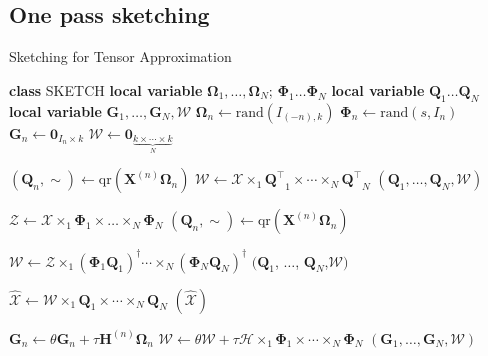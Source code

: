 \subsection{One pass sketching}


\begin{algorithm}[ht]
\caption{Sketching for Tensor Approximation}\label{alg:tensor_approx}
  \begin{algorithmic}[1]
  \State \textbf{class} SKETCH 
  \State \textbf{local variable} $\mathbf{\Omega}_1, \dots, \mathbf{\Omega}_N$;  $\mathbf{\Phi}_1 \dots \mathbf{\Phi}_N$  
  \State \textbf{local variable} $\mathbf{Q}_1 \dots \mathbf{Q}_N$ 
  \State \textbf{local variable} $\mathbf{G}_1, \dots, \mathbf{G}_N, \mathscr{W} $
  \Require
  \Statex 
  \Ensure
  \Statex 
    \State $\mathbf{\Omega}_n \leftarrow  \text{rand}(I_{(-n), k}) $  
    \State $\mathbf{\Phi}_n \leftarrow \text{rand}(s, I_n)  $
    \State $\mathbf{G}_n \leftarrow \mathbf{0}_{I_n \times k} $ 
  \EndFor 
  \State $\mathscr{W} \leftarrow \mathbf{0}_{\underbrace{k \times \cdots \times k}_N}$
  \EndFunction  

  \Statex
  \State $(\mathbf{Q}_n, \sim)\leftarrow $qr$(\mathbf{X}^{(n)}\mathbf{\Omega}_n)$
  \EndFor
  \State $\mathscr{W} \leftarrow \mathscr{X} \times_1 \mathbf{Q^\top}_1 \times \cdots \times_N \mathbf{Q^\top}_N$ 
  \State \Return  $(\mathbf{Q}_1, \dots, \mathbf{Q}_N, \mathscr{W})$
  \EndFunction

  \Statex 
  \State $\mathscr{Z} \leftarrow \mathscr{X}\times_1 \mathbf{\Phi}_1 \times \dots \times_N  \mathbf{\Phi}_N $
  \State $(\mathbf{Q}_n, \sim) \leftarrow $qr$(\mathbf{X}^{(n)}\mathbf{\Omega}_n)$ 
  \EndFor 

  \State $\mathscr{W} \leftarrow \mathscr{Z}\times_1 (\mathbf{\Phi}_1\mathbf{Q}_1)^\dag \cdots \times_N (\mathbf{\Phi}_N\mathbf{Q}_N)^\dag $
  \State \Return $(\mathbf{Q}_1$, $\dots$, $\mathbf{Q}_N$,$\mathscr{W})$ 
  \EndFunction

  \Statex 
  \State $\hat{\mathscr{X}} \leftarrow \mathscr{W} \times_1 \mathbf{Q}_1 \times \cdots \times_N \mathbf{Q}_N$ 
  \State \Return $(\hat{\mathscr{X}})$
  \EndFunction

  \Statex
  \State $\mathbf{G}_n \leftarrow \theta \mathbf{G}_n + \tau \mathbf{H}^{(n)} \mathbf{\Omega}_n $ 
  \EndFor
  \State $\mathscr{W} \leftarrow \theta \mathscr{W} + \tau \mathscr{H} \times_1 \mathbf{\Phi}_1 \times \cdots \times_N \mathbf{\Phi}_N $
  \State \Return $(\mathbf{G}_1, \dots, \mathbf{G}_N, \mathscr{W})$
  \EndFunction
  
\end{algorithmic}
\end{algorithm}
  
